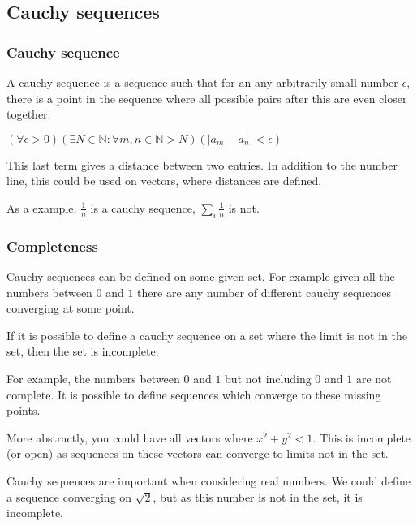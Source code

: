 
\subsection{Cauchy sequences}

\subsubsection{Cauchy sequence}

A cauchy sequence is a sequence such that for an any arbitrarily small number \(\epsilon\), there is a point in the sequence where all possible pairs after this are even closer together.

\((\forall \epsilon >0)(\exists N\in \mathbb{N}: \forall m,n \in \mathbb{N} >N)( |a_m - a_n|<\epsilon)\)

This last term gives a distance between two entries. In addition to the number line, this could be used on vectors, where distances are defined.

As a example, \(\frac{1}{n}\) is a cauchy sequence, \(\sum_i \frac{1}{n}\) is not.

\subsubsection{Completeness}

Cauchy sequences can be defined on some given set. For example given all the numbers between \(0\) and \(1\) there are any number of different cauchy sequences converging at some point.

If it is possible to define a cauchy sequence on a set where the limit is not in the set, then the set is incomplete.

For example, the numbers between \(0\) and \(1\) but not including \(0\) and \(1\) are not complete. It is possible to define sequences which converge to these missing points.

More abstractly, you could have all vectors where \(x^2+y^2<1\). This is incomplete (or open) as sequences on these vectors can converge to limits not in the set.

Cauchy sequences are important when considering real numbers. We could define a sequence converging on \(\sqrt 2\), but as this number is not in the set, it is incomplete.

